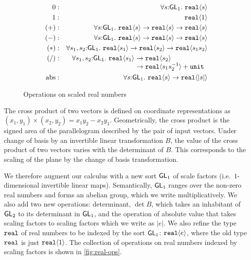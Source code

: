 \begin{figure}[t]
  \centering
  \begin{eqnarray*}
    0   &:& \forall s \mathord:\SynGL_1.\ \tyPrim{real}{s} \\
    1   &:& \tyPrim{real}{1} \\
    (+) &:& \forall s \mathord:\SynGL_1.\ \tyPrim{real}{s} \to \tyPrim{real}{s} \to \tyPrim{real}{s} \\
    (-) &:& \forall s \mathord:\SynGL_1.\ \tyPrim{real}{s} \to \tyPrim{real}{s} \to \tyPrim{real}{s} \\
    (*) &:& \forall s_1,s_2 \mathord:\SynGL_1.\ \tyPrim{real}{s_1} \to \tyPrim{real}{s_2} \to \tyPrim{real}{s_1s_2} \\
    (/) &:&
    \begin{array}[t]{@{}l@{}l}
      \forall s_1,s_2 \mathord:\SynGL_1.\ \tyPrim{real}{s_1}\ & \to \tyPrim{real}{s_2} \\
      &\to \tyPrim{real}{s_1s_2^{-1}} + \tyPrimNm{unit} \\
    \end{array}\\
    \mathrm{abs} &:& \forall s \mathord:\SynGL_1.\ \tyPrim{real}{s} \to \tyPrim{real}{|s|} %
  \end{eqnarray*}
  \caption{Operations on scaled real numbers}
  \label{fig:real-ops}
\end{figure}

The cross product of two vectors is defined on coordinate
representations as $(x_1,y_1) \times (x_2,y_2) = x_1y_2 - x_2y_1$.
Geometrically, the cross product is the signed area of the
parallelogram described by the pair of input vectors. Under change of
basis by an invertible linear transformation $B$, the value of the
cross product of two vectors varies with the determinant of $B$. This
corresponds to the scaling of the plane by the change of basis
transformation.

We therefore augment our calculus with a new sort $\mathsf{GL}_1$ of scale
factors (i.e.~$1$-dimensional invertible linear maps). Semantically,
$\mathsf{GL}_1$ ranges over the non-zero real numbers and forms an abelian
group, which we write multiplicatively. We also add two new
operations: determinant, $\det B$, which takes an inhabitant of
$\mathsf{GL}_2$ to its determinant in $\mathsf{GL}_1$, and the operation of
absolute value that takes scaling factors to scaling factors which we
write as $|e|$. We also refine the type $\texttt{real}$ of real
numbers to be indexed by the sort $\mathsf{GL}_1$: $\texttt{real}\langle e \rangle$,
where the old type $\texttt{real}$ is just $\texttt{real}\langle 1 \rangle$. The
collection of operations on real numbers indexed by scaling factors is
shown in \autoref{fig:real-ops}.

